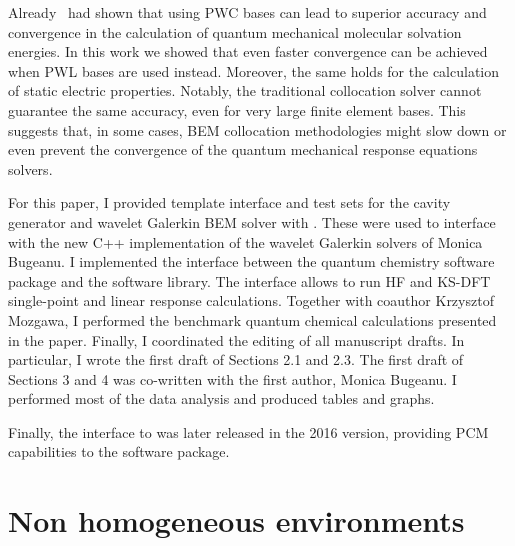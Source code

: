 Already~\citeauthor{Weijo2010-hy} had shown that using \gls{PWC} bases can lead
to superior accuracy and convergence in the calculation of quantum mechanical
molecular solvation energies.
In this work we showed that even faster convergence can be achieved when
\gls{PWL} bases are used instead.
Moreover, the same holds for the calculation of static electric properties.
Notably, the traditional collocation solver cannot guarantee the same accuracy,
even for very large finite element bases. This suggests that, in some cases,
\acrshort{BEM} collocation methodologies might slow down or even prevent the
convergence of the quantum mechanical response equations solvers.

For this paper, I provided template interface and test sets for the cavity
generator\autocite{Harbrecht2009-no, Harbrecht2011-dk} and wavelet Galerkin
\acrshort{BEM} solver\autocite{Harbrecht2004-uo, Harbrecht2006-ug} with \pcmsolver.
These were used to interface with the new C++ implementation of the wavelet
Galerkin solvers of Monica Bugeanu.
I implemented the interface between the \LSDALTON quantum chemistry software
package and the \pcmsolver software library. The interface allows to run \acrshort{HF} and
\acrshort{KS}-\acrshort{DFT} single-point and linear response calculations.
Together with coauthor Krzysztof Mozgawa, I performed the benchmark quantum
chemical calculations presented in the paper.
Finally, I coordinated the editing of all manuscript drafts.
In particular, I wrote the first draft of Sections 2.1 and 2.3.
The first draft of Sections 3 and 4 was co-written with the first author, Monica Bugeanu.
I performed most of the data analysis and produced tables and graphs.

Finally, the interface to \LSDALTON was later released in the 2016 version,
providing \acrshort{PCM} capabilities to the software package.

\section{Non homogeneous environments}\label{sec:spherical}

